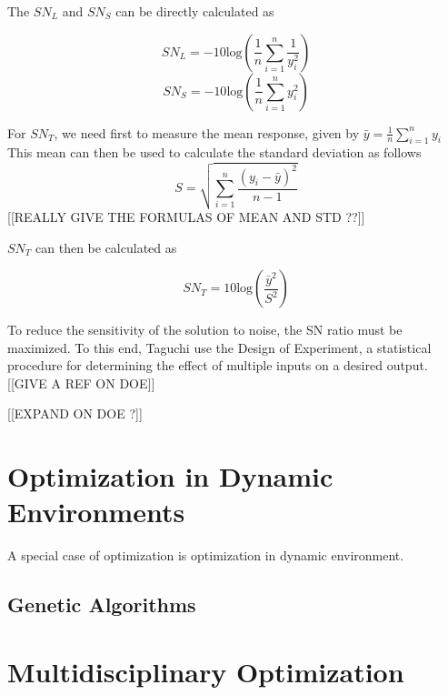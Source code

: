 The $SN_L$ and $SN_S$ can be directly calculated as

\[SN_L = -10\mbox{log}\left( \frac{1}{n} \sum_{i=1}^n \frac{1}{y_i^2} \right)\]
\[SN_S = -10\mbox{log}\left( \frac{1}{n} \sum_{i=1}^n y_i^2 \right)\]

For $SN_T$, we need first to measure the mean response, given by $\bar{y} = \frac{1}{n}\sum_{i=1}^n y_i$
This mean can then be used to calculate the standard deviation as follows 
\[S = \sqrt{\sum_{i=1}^n \frac{(y_i - \bar{y})^2}{n-1}}\]
[[REALLY GIVE THE FORMULAS OF MEAN AND STD ??]]

 $SN_T$ can then be calculated as
 
 \[ SN_T = 10\mbox{log}\left(\frac{\bar{y}^2}{S^2}\right) \]
 
 To reduce the sensitivity of the solution to noise, the SN ratio must be maximized. To this end, Taguchi use the Design of Experiment, a statistical procedure for determining the effect of multiple inputs on a desired output. [[GIVE A REF ON DOE]]

[[EXPAND ON DOE  ?]]

\subsection{}

\chapter{Optimization in Dynamic Environments}
A special case of optimization is optimization in dynamic environment.

\section{Genetic Algorithms}

\chapter{Multidisciplinary Optimization}